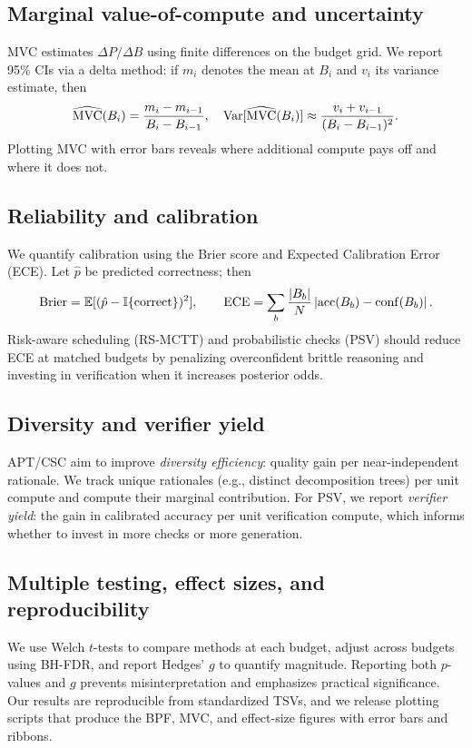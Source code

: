 \subsection{Marginal value-of-compute and uncertainty}
MVC estimates $\Delta P/\Delta B$ using finite differences on the budget grid. We report 95\% CIs via a delta method: if $m_i$ denotes the mean at $B_i$ and $v_i$ its variance estimate, then
\begin{equation}
\widehat{\text{MVC}}(B_{i}) = \frac{m_i - m_{i-1}}{B_i - B_{i-1}}, \quad
\mathrm{Var}[\widehat{\text{MVC}}(B_{i})] \approx \frac{v_i + v_{i-1}}{(B_i - B_{i-1})^2}.
\end{equation}
Plotting MVC with error bars reveals where additional compute pays off and where it does not.

\subsection{Reliability and calibration}
We quantify calibration using the Brier score and Expected Calibration Error (ECE). Let $\hat{p}$ be predicted correctness; then
\[
\text{Brier} = \mathbb{E}[(\hat{p}-\mathbb{I}\{\text{correct}\})^2], \qquad \text{ECE} = \sum_{b} \frac{|B_b|}{N} \left| \mathrm{acc}(B_b) - \mathrm{conf}(B_b)\right|.
\]
Risk-aware scheduling (RS-MCTT) and probabilistic checks (PSV) should reduce ECE at matched budgets by penalizing overconfident brittle reasoning and investing in verification when it increases posterior odds.

\subsection{Diversity and verifier yield}
APT/CSC aim to improve \emph{diversity efficiency}: quality gain per near-independent rationale. We track unique rationales (e.g., distinct decomposition trees) per unit compute and compute their marginal contribution. For PSV, we report \emph{verifier yield}: the gain in calibrated accuracy per unit verification compute, which informs whether to invest in more checks or more generation.

\subsection{Multiple testing, effect sizes, and reproducibility}
We use Welch $t$-tests to compare methods at each budget, adjust across budgets using BH-FDR, and report Hedges’ $g$ to quantify magnitude. Reporting both $p$-values and $g$ prevents misinterpretation and emphasizes practical significance. Our results are reproducible from standardized TSVs, and we release plotting scripts that produce the BPF, MVC, and effect-size figures with error bars and ribbons.

